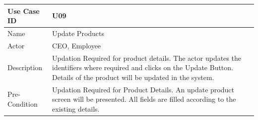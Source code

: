 \documentclass[12pt,a4paper]{report}
\begin{document}
\begin{tabular}{ | m{3cm} | m{12cm}| } \hline

Use Case ID &  U09 \\\hline

Name  	    &  Update Products \\ \hline

Actor     	& CEO, Employee \\ \hline

Description &  Updation Required for product details. The actor updates the identifiers where required and clicks on the Update Button. Details of the product will be updated in the system. \\ \hline



Pre-Condition &  Updation Required for Product Details. An update product screen will be presented. All fields are filled according to the existing details. \\ \hline
\end{tabular}
\end{document}
